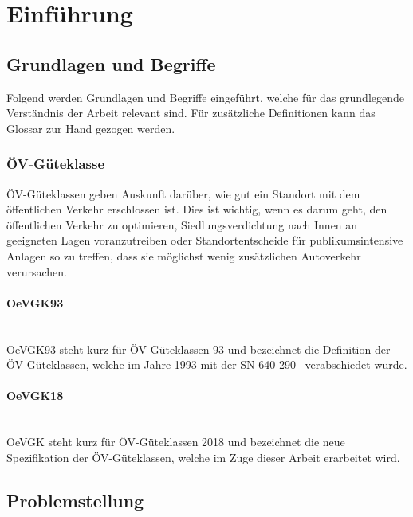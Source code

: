 
\section{Einführung}
\label{Einführung}


\subsection{Grundlagen und Begriffe}
\label{Einführung:Grundlagen und Begriffe}

Folgend werden Grundlagen und Begriffe eingeführt, welche für das grundlegende Verständnis der Arbeit relevant sind. Für zusätzliche Definitionen kann das Glossar zur Hand gezogen werden.

\subsubsection{ÖV-Güteklasse}
\label{Grundlagen und Begriffe:ÖV-Güteklasse}
\acs{ÖV}-Güteklassen geben Auskunft darüber, wie gut ein Standort mit dem öffentlichen Verkehr erschlossen ist.
Dies ist wichtig, wenn es darum geht, den öffentlichen Verkehr zu optimieren, Siedlungsverdichtung nach Innen an geeigneten Lagen voranzutreiben oder Standortentscheide für publikumsintensive Anlagen so zu treffen, dass sie möglichst wenig zusätzlichen Autoverkehr verursachen.~\cite{oev-guteklasse-gr-defintion}

\paragraph{OeVGK93}~\\
OeVGK93 steht kurz für \acs{ÖV}-Güteklassen 93 und bezeichnet die Definition der \acs{ÖV}-Güteklassen, welche im Jahre 1993 mit der \acs{SN} 640 290~\cite{sn640290} verabschiedet wurde.

\paragraph{OeVGK18}~\\
OeVGK steht kurz für \acs{ÖV}-Güteklassen 2018 und bezeichnet die neue Spezifikation der \acs{ÖV}-Güteklassen, welche im Zuge dieser Arbeit erarbeitet wird.

\subsection{Problemstellung}
\label{Einführung:Problemstellung}

